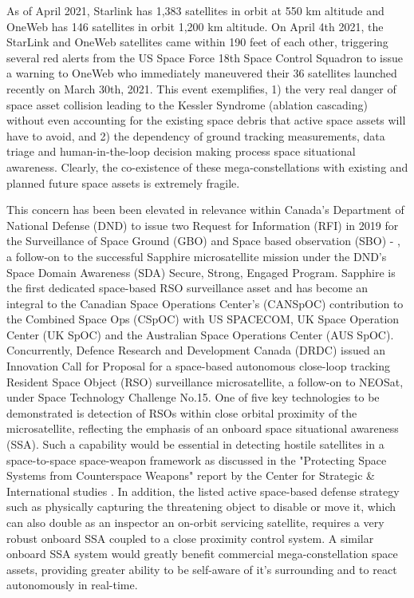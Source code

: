 As of April 2021, Starlink has 1,383 satellites in orbit at 550 km altitude and OneWeb has 146 satellites in orbit 1,200 km altitude. On April 4th 2021, the StarLink and OneWeb satellites came within 190 feet of each other, triggering several red alerts from the US Space Force 18th Space Control Squadron to issue a warning to OneWeb who immediately maneuvered their 36 satellites launched recently on March 30th, 2021\footnotemark{}. This event exemplifies, 1) the very real danger of space asset collision leading to the Kessler Syndrome (ablation cascading) \cite{KesslerSyndrome78} without even accounting for the existing space debris that active space assets will have to avoid, and 2) the dependency of ground tracking measurements, data triage and human-in-the-loop decision making process space situational awareness. Clearly, the co-existence of these mega-constellations with existing and planned future space assets is extremely fragile.

This concern has been been elevated in relevance within Canada's Department of National Defense (DND) to issue two Request for Information (RFI) in 2019 for the Surveillance of Space Ground (GBO) and Space based observation (SBO) \cite{dndRfi19a} - \cite{dndRfi19b}, a follow-on to the successful Sapphire microsatellite mission under the DND's Space Domain Awareness (SDA) Secure, Strong, Engaged Program. Sapphire is the first dedicated space-based RSO surveillance asset and has become an integral to the Canadian Space Operations Center's (CANSpOC) contribution to the Combined Space Ops (CSpOC) with US SPACECOM,  UK Space Operation Center (UK SpOC) and the Australian Space Operations Center (AUS SpOC). Concurrently, Defence Research and Development Canada (DRDC) issued an Innovation Call for Proposal  \cite{drdcCall19} for a space-based autonomous close-loop tracking Resident Space Object (RSO) surveillance microsatellite, a follow-on to NEOSat, under Space Technology Challenge No.15. One of five key technologies to be demonstrated is detection of RSOs within close orbital proximity of the microsatellite, reflecting the emphasis of an onboard space situational awareness (SSA). Such a capability would be essential in detecting hostile satellites in a space-to-space space-weapon framework as discussed in the "Protecting Space Systems from Counterspace Weapons" report by the Center for Strategic \& International studies \cite{darkArts21}. In addition, the listed active space-based defense strategy such as physically capturing the threatening object to disable or move it, which can also double as an inspector an on-orbit servicing satellite, requires a very robust onboard SSA coupled to a close proximity control system. A similar onboard SSA system would greatly benefit commercial mega-constellation space assets, providing greater ability to be self-aware of it's surrounding and to react autonomously in real-time.

